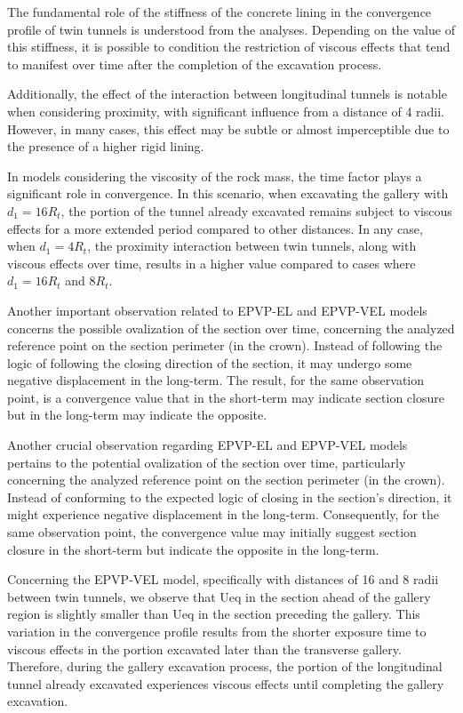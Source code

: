 \documentclass[a4paper,fleqn]{cas-sc}
\begin{document}
The fundamental role of the stiffness of the concrete lining in the convergence profile of twin tunnels is understood from the analyses. Depending on the value of this stiffness, it is possible to condition the restriction of viscous effects that tend to manifest over time after the completion of the excavation process.

Additionally, the effect of the interaction between longitudinal tunnels is notable when considering proximity, with significant influence from a distance of 4 radii. However, in many cases, this effect may be subtle or almost imperceptible due to the presence of a higher rigid lining.

In models considering the viscosity of the rock mass, the time factor plays a significant role in convergence. In this scenario, when excavating the gallery with $d_1 = 16R_t$, the portion of the tunnel already excavated remains subject to viscous effects for a more extended period compared to other distances. In any case, when $d_1 = 4R_t$, the proximity interaction between twin tunnels, along with viscous effects over time, results in a higher value compared to cases where $d_1 = 16R_t$ and $8R_t$.

Another important observation related to EPVP-EL and EPVP-VEL models concerns the possible ovalization of the section over time, concerning the analyzed reference point on the section perimeter (in the crown). Instead of following the logic of following the closing direction of the section, it may undergo some negative displacement in the long-term. The result, for the same observation point, is a convergence value that in the short-term may indicate section closure but in the long-term may indicate the opposite.

Another crucial observation regarding EPVP-EL and EPVP-VEL models pertains to the potential ovalization of the section over time, particularly concerning the analyzed reference point on the section perimeter (in the crown). Instead of conforming to the expected logic of closing in the section's direction, it might experience negative displacement in the long-term. Consequently, for the same observation point, the convergence value may initially suggest section closure in the short-term but indicate the opposite in the long-term.

Concerning the EPVP-VEL model, specifically with distances of 16 and 8 radii between twin tunnels, we observe that Ueq in the section ahead of the gallery region is slightly smaller than Ueq in the section preceding the gallery. This variation in the convergence profile results from the shorter exposure time to viscous effects in the portion excavated later than the transverse gallery. Therefore, during the gallery excavation process, the portion of the longitudinal tunnel already excavated experiences viscous effects until completing the gallery excavation. 
\end{document}
